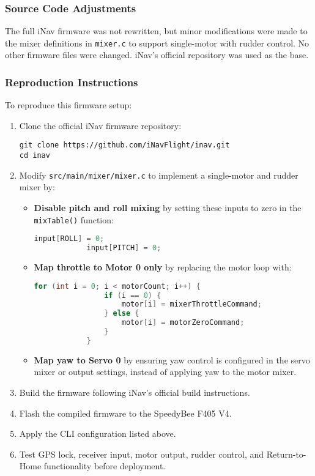 \subsubsection*{Source Code Adjustments}

The full iNav firmware was not rewritten, but minor modifications were made to the mixer definitions in \texttt{mixer.c} to support single-motor with rudder control. No other firmware files were changed. iNav’s official repository was used as the base.

\subsubsection*{Reproduction Instructions}

To reproduce this firmware setup:

\begin{enumerate}
    \item Clone the official iNav firmware repository:
    \begin{lstlisting}
git clone https://github.com/iNavFlight/inav.git
cd inav
    \end{lstlisting}

    
    \item Modify \texttt{src/main/mixer/mixer.c} to implement a single-motor and rudder mixer by:
    \begin{itemize}
        \item \textbf{Disable pitch and roll mixing} by setting these inputs to zero in the \texttt{mixTable()} function:
        \begin{lstlisting}[language=C]
            input[ROLL] = 0;
            input[PITCH] = 0;
        \end{lstlisting}

        \item \textbf{Map throttle to Motor 0 only} by replacing the motor loop with:
        \begin{lstlisting}[language=C]
            for (int i = 0; i < motorCount; i++) {
                if (i == 0) {
                    motor[i] = mixerThrottleCommand;
                } else {
                    motor[i] = motorZeroCommand;
                }
            }
        \end{lstlisting}

        \item \textbf{Map yaw to Servo 0} by ensuring yaw control is configured in the servo mixer or output settings, instead of applying yaw to the motor mixer.
    \end{itemize}


    \item Build the firmware following iNav's official build instructions.

    \item Flash the compiled firmware to the SpeedyBee F405 V4.

    \item Apply the CLI configuration listed above.

    \item Test GPS lock, receiver input, motor output, rudder control, and Return-to-Home functionality before deployment.
\end{enumerate}

